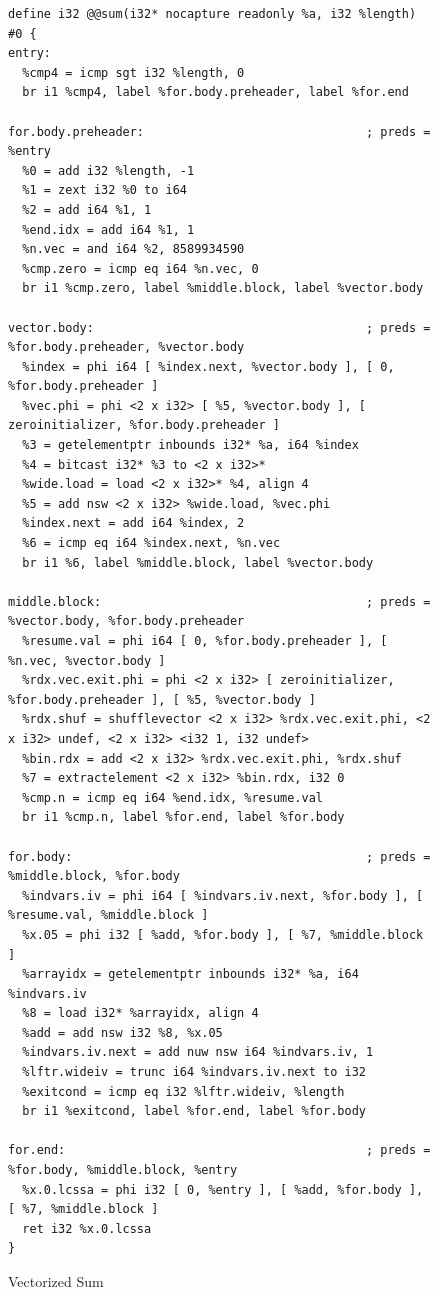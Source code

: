 \documentclass[a4paper,bibliography=totocnumbered,parskip,headsepline]{scrbook}
\begin{document}
\begin{figure}
\begin{lstlisting}[basicstyle=\scriptsize\ttfamily, xleftmargin=0pt]
define i32 @@sum(i32* nocapture readonly %a, i32 %length) #0 {
entry:
  %cmp4 = icmp sgt i32 %length, 0
  br i1 %cmp4, label %for.body.preheader, label %for.end

for.body.preheader:                               ; preds = %entry
  %0 = add i32 %length, -1
  %1 = zext i32 %0 to i64
  %2 = add i64 %1, 1
  %end.idx = add i64 %1, 1
  %n.vec = and i64 %2, 8589934590
  %cmp.zero = icmp eq i64 %n.vec, 0
  br i1 %cmp.zero, label %middle.block, label %vector.body

vector.body:                                      ; preds = %for.body.preheader, %vector.body
  %index = phi i64 [ %index.next, %vector.body ], [ 0, %for.body.preheader ]
  %vec.phi = phi <2 x i32> [ %5, %vector.body ], [ zeroinitializer, %for.body.preheader ]
  %3 = getelementptr inbounds i32* %a, i64 %index
  %4 = bitcast i32* %3 to <2 x i32>*
  %wide.load = load <2 x i32>* %4, align 4
  %5 = add nsw <2 x i32> %wide.load, %vec.phi
  %index.next = add i64 %index, 2
  %6 = icmp eq i64 %index.next, %n.vec
  br i1 %6, label %middle.block, label %vector.body

middle.block:                                     ; preds = %vector.body, %for.body.preheader
  %resume.val = phi i64 [ 0, %for.body.preheader ], [ %n.vec, %vector.body ]
  %rdx.vec.exit.phi = phi <2 x i32> [ zeroinitializer, %for.body.preheader ], [ %5, %vector.body ]
  %rdx.shuf = shufflevector <2 x i32> %rdx.vec.exit.phi, <2 x i32> undef, <2 x i32> <i32 1, i32 undef>
  %bin.rdx = add <2 x i32> %rdx.vec.exit.phi, %rdx.shuf
  %7 = extractelement <2 x i32> %bin.rdx, i32 0
  %cmp.n = icmp eq i64 %end.idx, %resume.val
  br i1 %cmp.n, label %for.end, label %for.body

for.body:                                         ; preds = %middle.block, %for.body
  %indvars.iv = phi i64 [ %indvars.iv.next, %for.body ], [ %resume.val, %middle.block ]
  %x.05 = phi i32 [ %add, %for.body ], [ %7, %middle.block ]
  %arrayidx = getelementptr inbounds i32* %a, i64 %indvars.iv
  %8 = load i32* %arrayidx, align 4
  %add = add nsw i32 %8, %x.05
  %indvars.iv.next = add nuw nsw i64 %indvars.iv, 1
  %lftr.wideiv = trunc i64 %indvars.iv.next to i32
  %exitcond = icmp eq i32 %lftr.wideiv, %length
  br i1 %exitcond, label %for.end, label %for.body

for.end:                                          ; preds = %for.body, %middle.block, %entry
  %x.0.lcssa = phi i32 [ 0, %entry ], [ %add, %for.body ], [ %7, %middle.block ]
  ret i32 %x.0.lcssa
}
\end{lstlisting}
\caption{Vectorized Sum}
\label{fig:sumllvec}
\end{figure}
\end{document}
